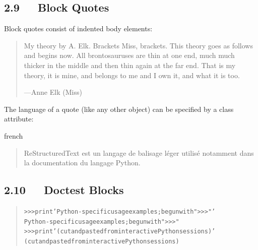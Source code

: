 \documentclass[a4paper]{article}
\begin{document}
\subsection{2.9   Block Quotes%
  \label{block-quotes}%
}

Block quotes consist of indented body elements:

\begin{quote}
My theory by A. Elk.  Brackets Miss, brackets.  This theory goes
as follows and begins now.  All brontosauruses are thin at one
end, much much thicker in the middle and then thin again at the
far end.  That is my theory, it is mine, and belongs to me and I
own it, and what it is too.
\nopagebreak

\raggedleft —Anne Elk (Miss)
\end{quote}

The language of a quote (like any other object) can be specified by
a class attribute:

% 

\begin{selectlanguage}{french}
\begin{quote}
ReStructuredText est un langage de balisage léger utilisé
notamment dans la documentation du langage Python.
\end{quote}
\end{selectlanguage}


\subsection{2.10   Doctest Blocks%
  \label{doctest-blocks}%
}

\begin{quote}
\begin{alltt}
>>> print 'Python-specific usage examples; begun with ">>>"'
Python-specific usage examples; begun with ">>>"
>>> print '(cut and pasted from interactive Python sessions)'
(cut and pasted from interactive Python sessions)
\end{alltt}
\end{quote}
\end{document}
